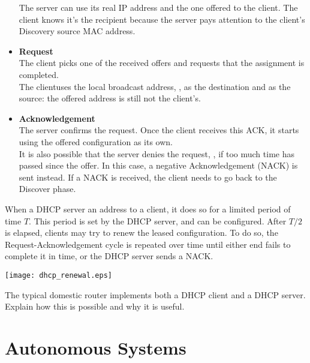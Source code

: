 \begin{itemize}
The server can use its real IP address and the one offered to the client.
The client knows it's the recipient because the server pays attention to the 
client's Discovery source MAC address.

\vspace{0.25cm}
\item \textbf{Request}\\
The client picks one of the received offers and requests that the 
assignment is completed.\\[-0.3cm]

The clientuses the local broadcast
address, , as the destination and 
 as the source: the offered address is still not the client's.

\vspace{0.25cm}
\item \textbf{Acknowledgement}\\
The server confirms the request. Once the client receives this ACK,
it starts using the offered configuration as its own. \\[-0.3cm]

It is also possible that the server denies the request, \eg, if 
too much time has passed since the offer. In this case, 
a negative Acknowledgement (NACK) is sent instead. If a NACK is received,
the client needs to go back to the Discover phase.
\end{itemize}

When a DHCP server  an address to a client, it does 
so for a limited period of time $T$. This period is set by the DHCP server, and can be configured.
After $T/2$ is elapsed, clients may try to renew the leased configuration. To do so,
the Request-Acknowledgement cycle is repeated over time until either end fails to complete it in time,
or the DHCP server sends a NACK.

\begin{center}
\texttt{[image: dhcp\_renewal.eps]}
\end{center}

\begin{exercise}
The typical domestic router implements both a DHCP client and a DHCP server.
Explain how this is possible and why it is useful.
\end{exercise}


\section{Autonomous Systems}

